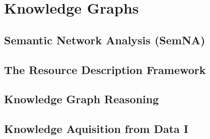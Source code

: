     \part{Knowledge Graphs}\label{part:knowledge-graphs}
    \chapter{Semantic Network Analysis (SemNA)}
    

    \chapter{The Resource Description Framework}
    

    \chapter{Knowledge Graph Reasoning}
    

    \chapter{Knowledge Aquisition from Data I}
    












